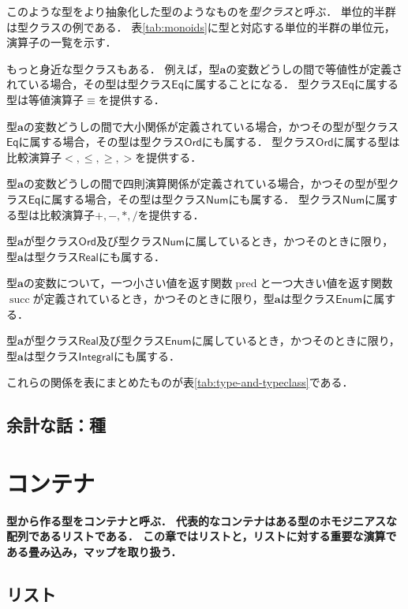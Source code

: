 \documentclass[twocolumn]{jsbook}
\newcommand{\hsklType}[1]{\textbf{#1}}
\newcommand{\hsklTypeclass}[1]{\mathsf{#1}}
\DeclareMathOperator{\hsklPred}{pred}
\DeclareMathOperator{\hsklSucc}{succ}
\newcommand{\hsklEnum}{\hsklTypeclass{Enum}}
\newcommand{\hsklIntegral}{\hsklTypeclass{Integral}}
\newcommand{\hsklEq}{\hsklTypeclass{Eq}}
\newcommand{\hsklNum}{\hsklTypeclass{Num}}
\newcommand{\hsklOrd}{\hsklTypeclass{Ord}}
\newcommand{\hsklReal}{\hsklTypeclass{Real}}
\newcommand{\keyword}[1]{\emph{#1}}
\newenvironment{leader}{\begingroup\bf}{\endgroup}
\begin{document}
このような型をより抽象化した型のようなものを\keyword{型クラス}と呼ぶ．
単位的半群は型クラスの例である．
表\ref{tab:monoids}に型と対応する単位的半群の単位元，演算子の一覧を示す．

もっと身近な型クラスもある．
例えば，型$\hsklType{a}$の変数どうしの間で等値性が定義されている場合，その型は型クラス$\hsklEq$に属することになる．
型クラス$\hsklEq$に属する型は等値演算子$\equiv$を提供する．

型$\hsklType{a}$の変数どうしの間で大小関係が定義されている場合，かつその型が型クラス$\hsklEq$に属する場合，その型は型クラス$\hsklOrd$にも属する．
型クラス$\hsklOrd$に属する型は比較演算子$<,\le,\ge,>$を提供する．

型$\hsklType{a}$の変数どうしの間で四則演算関係が定義されている場合，かつその型が型クラス$\hsklEq$に属する場合，その型は型クラス$\hsklNum$にも属する．
型クラス$\hsklNum$に属する型は比較演算子$+,-,*,/$を提供する．

型$\hsklType{a}$が型クラス$\hsklOrd$及び型クラス$\hsklNum$に属しているとき，かつそのときに限り，型$\hsklType{a}$は型クラス$\hsklReal$にも属する．

型$\hsklType{a}$の変数について，一つ小さい値を返す関数$\hsklPred$と一つ大きい値を返す関数$\hsklSucc$が定義されているとき，かつそのときに限り，型$\hsklType{a}$は型クラス$\hsklEnum$に属する．

型$\hsklType{a}$が型クラス$\hsklReal$及び型クラス$\hsklEnum$に属しているとき，かつそのときに限り，型$\hsklType{a}$は型クラス$\hsklIntegral$にも属する．

これらの関係を表にまとめたものが表\ref{tab:type-and-typeclass}である．

\section*{余計な話：種}

\chapter{コンテナ}

\begin{leader}
型から作る型をコンテナと呼ぶ．
代表的なコンテナはある型のホモジニアスな配列であるリストである．
この章ではリストと，リストに対する重要な演算である畳み込み，マップを取り扱う．
\end{leader}

\section{リスト}
\end{document}
